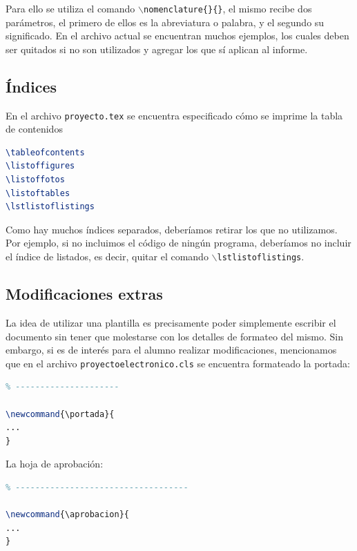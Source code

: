 Para ello se utiliza el comando \texttt{$\backslash$nomenclature\{\}\{\}}, el mismo recibe dos parámetros, el primero de ellos es la abreviatura o palabra, y el segundo su significado. En el archivo actual se encuentran muchos ejemplos, los cuales deben ser quitados si no son utilizados y agregar los que sí aplican al informe.

\subsection{Índices}

En el archivo \texttt{proyecto.tex} se encuentra especificado cómo se imprime la tabla de contenidos

\footnotesize
\begin{lstlisting}[language=TeX, numbers=none]
% 5. TABLAS DE CONTENIDO, FIGURAS Y TABLAS
\tableofcontents
\listoffigures
\listoffotos
\listoftables
\lstlistoflistings
\end{lstlisting}
\normalsize

Como hay muchos índices separados, deberíamos retirar los que no utilizamos. Por ejemplo, si no incluimos el código de ningún programa, deberíamos no incluir el índice de listados, es decir, quitar el comando \texttt{$\backslash$lstlistoflistings}.

\clearpage
\subsection{Modificaciones extras}

La idea de utilizar una plantilla es precisamente poder simplemente escribir el documento sin tener que molestarse con los detalles de formateo del mismo. Sin embargo, si es de interés para el alumno realizar modificaciones, mencionamos que en el archivo \texttt{proyectoelectronico.cls} se encuentra formateado la portada:

\footnotesize
\begin{lstlisting}[language=TeX, numbers=none]
% 1. Formato de portada
% ---------------------

\newcommand{\portada}{
...
}
\end{lstlisting}
\normalsize

La hoja de aprobación:

\footnotesize
\begin{lstlisting}[language=TeX, numbers=none]
% 2. Formato de la hoja de aprobacion
% -----------------------------------

\newcommand{\aprobacion}{
...
}
\end{lstlisting}
\normalsize


